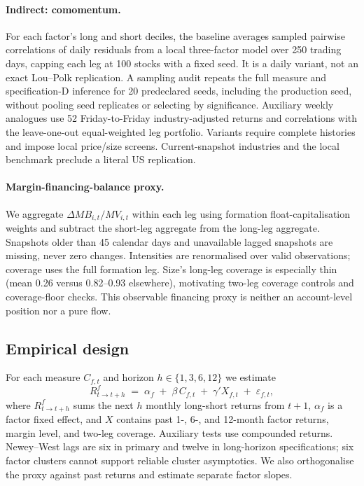 \documentclass[final,1p,authoryear]{elsarticle}
\begin{document}
\paragraph{Indirect: comomentum.}
For each factor's long and short deciles, the baseline averages sampled pairwise correlations
of daily residuals from a local three-factor model over 250 trading days, capping each leg at
100 stocks with a fixed seed. It is a daily variant, not an exact Lou--Polk replication.
A sampling audit repeats the full measure and specification-D inference for 20 predeclared seeds,
including the production seed, without pooling seed replicates or selecting by significance.
Auxiliary weekly analogues use 52 Friday-to-Friday industry-adjusted returns and correlations
with the leave-one-out equal-weighted leg portfolio. Variants require complete histories and
impose local price/size screens. Current-snapshot industries and the local benchmark preclude
a literal US replication.

\paragraph{Margin-financing-balance proxy.}
We aggregate $\Delta MB_{i,t}/MV_{i,t}$ within each leg using formation float-capitalisation
weights and subtract the short-leg aggregate from the long-leg aggregate. Snapshots older than
45 calendar days and unavailable lagged snapshots are missing, never zero changes. Intensities
are renormalised over valid observations; coverage uses the full formation leg. Size's long-leg
coverage is especially thin (mean 0.26 versus 0.82--0.93 elsewhere), motivating two-leg coverage
controls and coverage-floor checks. This observable financing proxy is neither an account-level
position nor a pure flow.

\subsection{Empirical design}

\noindent For each measure $C_{f,t}$ and horizon $h \in \{1,3,6,12\}$ we estimate
\begin{equation}
R^{f}_{t \to t+h} \;=\; \alpha_f \;+\; \beta\, C_{f,t} \;+\; \gamma' X_{f,t} \;+\; \varepsilon_{f,t},
\end{equation}
where $R^{f}_{t\to t+h}$ sums the next $h$ monthly long-short returns from $t+1$, $\alpha_f$
is a factor fixed effect, and $X$ contains past 1-, 6-, and 12-month factor returns, margin
level, and two-leg coverage. Auxiliary tests use compounded returns. Newey--West lags are six
in primary and twelve in long-horizon specifications; six factor clusters cannot support reliable
cluster asymptotics. We also orthogonalise the proxy against past returns and estimate separate
factor slopes.
\end{document}

